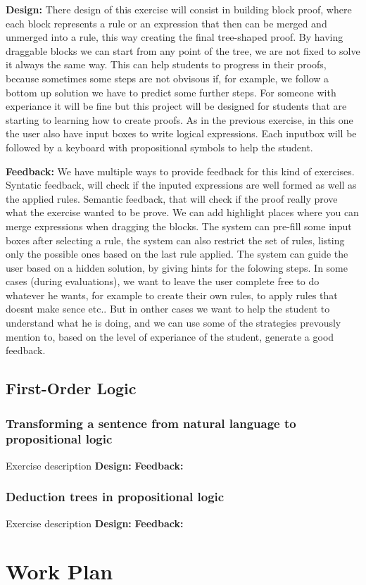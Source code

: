 \textbf{Design: } There design of this exercise will consist in building block proof, where each block represents a rule or an expression that then can be merged and unmerged into a rule, this way creating the final tree-shaped proof. By having draggable blocks we can start from any point of the tree, we are not fixed to solve it always the same way. This can help students to progress in their proofs, because sometimes some steps are not obvisous if, for example, we follow a bottom up solution we have to predict some further steps. For someone with experiance it will be fine but this project will be designed for students that are starting to learning how to create proofs. As in the previous exercise, in this one the user also have input boxes to write logical expressions. Each inputbox will be followed by a keyboard with propositional symbols to help the student.  

\textbf{Feedback: } We have multiple ways to provide feedback for this kind of exercises. Syntatic feedback, will check if the inputed expressions are well formed as well as the applied rules. Semantic feedback, that will check if the proof really prove what the exercise wanted to be prove. We can add highlight places where you can merge expressions when dragging the blocks. The system can pre-fill some input boxes after selecting a rule, the system can also restrict the set of rules, listing only the possible ones based on the last rule applied. The system can guide the user based on a hidden solution, by giving hints for the folowing steps. In some cases (during evaluations),  we want to leave the user complete free to do whatever he wants, for example to create their own rules, to apply rules that doesnt make sence etc.. But in onther cases we want to help the student to understand what he is doing, and we can use some of the strategies prevously mention to, based on the level of experiance of the student, generate a good feedback.


\subsection{First-Order Logic}

\subsubsection{Transforming a sentence from natural language to propositional logic}
Exercise description
\textbf{Design: }
\textbf{Feedback: }

\subsubsection{Deduction trees in propositional logic}
Exercise description
\textbf{Design: }
\textbf{Feedback: }

\section{Work Plan}
